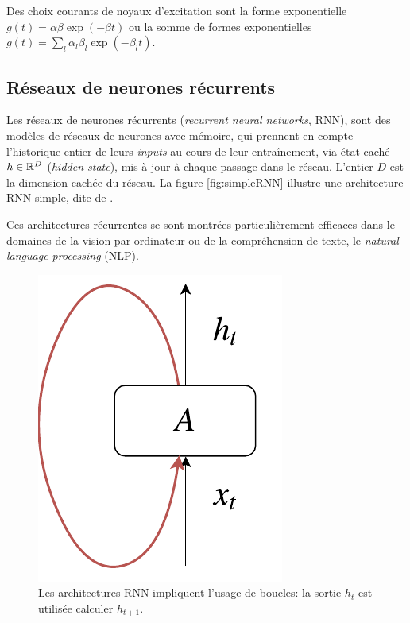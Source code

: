 \documentclass[../main.tex]{subfiles}
\begin{document}
Des choix courants de noyaux d'excitation sont la forme exponentielle $g(t) = \alpha\beta\exp(-\beta t)$ ou la somme de formes exponentielles $g(t) = \sum_l \alpha_l\beta_l\exp(-\beta_l t)$.

\subsection{Réseaux de neurones récurrents}

Les réseaux de neurones récurrents (\textit{recurrent neural networks}, RNN), sont des modèles de réseaux de neurones avec mémoire, qui prennent en compte l'historique entier de leurs \textit{inputs} au cours de leur entraînement, via état caché $h\in\mathbb{R}^D$ (\textit{hidden state}), mis à jour à chaque passage dans le réseau. L'entier $D$ est la dimension cachée du réseau. La figure \autoref{fig:simpleRNN} illustre une architecture RNN simple, dite de \citeauthor{elman1990srnn} \cite{elman1990srnn}.

Ces architectures récurrentes se sont montrées particulièrement efficaces dans le domaines de la vision par ordinateur ou de la compréhension de texte, le \textit{natural language processing} (NLP). \cite{unreasonableEffectivenessRNN}

\begin{figure}
	\centering
	\includegraphics[height=0.2\textheight]{diagrams/rnn.pdf}
	\caption{Les architectures RNN impliquent l'usage de boucles: la sortie $h_t$ est utilisée calculer $h_{t+1}$.}\label{fig:simpleRNN}
\end{figure}
\end{document}
